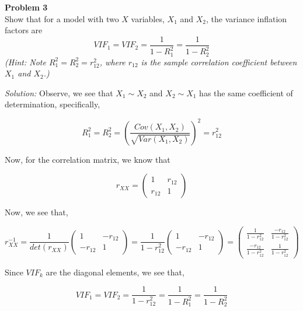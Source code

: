 \documentclass{article}
\newenvironment{problem}[2][Problem]
    { \begin{mdframed}[backgroundcolor=gray!20] \textbf{#1 #2} \\}
    {  \end{mdframed}}
\newenvironment{solution}
    {\textit{Solution:}}
    {}
\begin{document}
\begin{problem}{3}
 Show that for a model with two $X$ variables, $X_1$ and $X_2$, the variance inflation factors are
$$VIF_1 =VIF_2 = \frac{1}{1 - R^2_1} = \frac{1}{1 - R^2_2}$$
\emph{(Hint: Note $R_{1}^2 = R^2_2 = r^2_{12}$, where $r_{12}$ is the sample correlation coefficient between $X_1$ and $X_2$.)}
\end{problem}
\begin{solution}
Observe, we see that $X_1 \sim X_2$ and $X_2 \sim X_1$ has the same coefficient of determination, specifically, 

$$R_1^2 = R_2^2 = \left ( \frac{Cov(X_1, X_2)}{\sqrt{Var(X_1, X_2)}} \right)^2 = r_{12}^2$$

Now, for the correlation matrix, we know that 

$$r_{XX} = \begin{pmatrix}
1 & r_{12} \\
r_{12} & 1
\end{pmatrix}$$

Now, we see that, 

$$r_{XX}^{-1} = \frac{1}{det(r_{XX})} \begin{pmatrix}
1 & -r_{12} \\
-r_{12} & 1
\end{pmatrix} = \frac{1}{1 - r_{12}^2}  \begin{pmatrix}
1 & -r_{12} \\
-r_{12} & 1
\end{pmatrix} = \begin{pmatrix}
\frac{1}{1 - r_{12}^2} & \frac{-r_{12}}{1 - r_{12}^2} \\
\frac{-r_{12}}{1 - r_{12}^2} & \frac{1}{1 - r_{12}^2}
\end{pmatrix} $$

Since $VIF_k$ are the diagonal elements, we see that, 

$$VIF_1 = VIF_2 =  \frac{1}{1 - r_{12}^2} = \frac{1}{1 - R_1^2} = \frac{1}{1 - R_2^2} $$

\end{solution}
\end{document}
